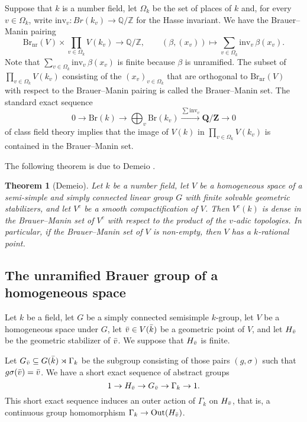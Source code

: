 \documentclass[10pt,letterpaper,twoside]{article}
\renewcommand{\1}{\mathbf{1}}
\newcommand{\bQ}{\mathbf{Q}}
\newcommand{\bZ}{\mathbf{Z}}
\newcommand{\inv}{\mathrm{inv}}
\newcommand{\nr}{\mathrm{nr}}
\newcommand{\Br}{\mathrm{Br}}
\theoremstyle{plain}
\newtheorem{theorem}{Theorem}[section]
\theoremstyle{plain}
\theoremstyle{definition}
\theoremstyle{named}
\theoremstyle{definition}
\begin{document}
Suppose that $k$ is a number field, let $\Omega_k$ be the set of places of $k$ and, for every $v \in \Omega_k$, write $\text{inv}_v: Br(k_v) \to \mathbb{Q}/\mathbb{Z}$ for the Hasse invariant. We have the Brauer--Manin pairing
\[
\Br_\nr(V) \times \prod_{v \in \Omega_k} V(k_v) \to \mathbb{Q}/\mathbb{Z}, \qquad (\beta, (x_v)) \mapsto \sum_{v \in \Omega_k} \text{inv}_v \, \beta(x_v).
\]
Note that $\sum_{v \in \Omega_k} \text{inv}_v \, \beta(x_v)$ is finite because $\beta$ is
unramified. The subset of $\prod_{v \in \Omega_k} V(k_v)$ consisting of the $(x_v)_{v\in \Omega_k}$
that are orthogonal to $\Br_\nr(V)$ with respect to the Brauer--Manin pairing is called the
Brauer--Manin set. The standard exact sequence
$$0\rightarrow\Br(k)\rightarrow\bigoplus_v\Br(k_v)\xrightarrow{\sum\inv_v}\bQ/\bZ\rightarrow 0$$ of class field theory implies that the image of $V(k)$ in $\prod_{v \in \Omega_k} V(k_v)$ is contained in the Brauer--Manin set.

The following theorem is due to Demeio \cite{}.

\begin{theorem}[Demeio]
	Let $k$ be a number field, let $V$ be a homogeneous space of a semi-simple and simply connected
	linear group $G$ with finite solvable geometric stabilizers, and let $V^c$ be a smooth
	compactification of $V$. Then $V^c(k)$ is dense in the Brauer–Manin set of $V^c$ with respect to
	the product of the $v$-adic topologies. In particular, if the Brauer--Manin set of $V$ is
	non-empty, then $V$ has a $k$-rational point.
\end{theorem}



\subsection{The unramified Brauer group of a homogeneous space}
	Let $k$ be a field, let $G$ be a simply connected semisimple $k$-group, let $V$ be a homogeneous space under $G$, let $\Bar{v}\in V(\Bar{k})$ be a geometric point of $V$, and let $H_{\Bar{v}}$ be the geometric stabilizer of $\Bar{v}$. We suppose that $H_{\Bar{v}}$ is finite.
	
	Let $G_{\Bar{v}} \subseteq G(\Bar{k}) \rtimes \Gamma_k$ be the subgroup consisting of those pairs $(g, \sigma)$ such that $g\sigma(\Bar{v}) = \Bar{v}$. We have a short exact sequence of abstract groups
	\[
	1 \to H_{\Bar{v}} \to G_{\Bar{v}} \to \Gamma_k \to 1.
	\]
	This short exact sequence induces an outer action of $\Gamma_k$ on $H_{\Bar{v}}$, that is, a continuous group homomorphism $\Gamma_k\to \mathrm{Out}(H_{\Bar{v}})$. 
	
\end{document}

